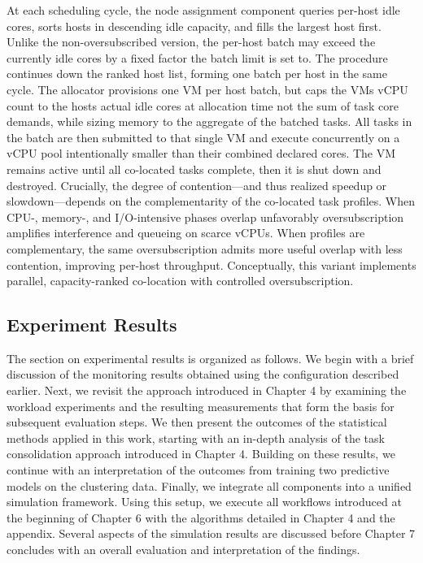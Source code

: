 At each scheduling cycle, the node assignment component queries per-host idle cores, sorts hosts in descending idle capacity, and fills the largest host first. Unlike the non-oversubscribed version, the per-host batch may exceed the currently idle cores by a fixed factor the batch limit is set to. The procedure continues down the ranked host list, forming one batch per host in the same cycle.
The allocator provisions one VM per host batch, but caps the VMs vCPU count to the hosts actual idle cores at allocation time not the sum of task core demands, while sizing memory to the aggregate of the batched tasks. All tasks in the batch are then submitted to that single VM and execute concurrently on a vCPU pool intentionally smaller than their combined declared cores. The VM remains active until all co-located tasks complete, then it is shut down and destroyed.
Crucially, the degree of contention—and thus realized speedup or slowdown—depends on the complementarity of the co-located task profiles. When CPU-, memory-, and I/O-intensive phases overlap unfavorably oversubscription amplifies interference and queueing on scarce vCPUs. When profiles are complementary, the same oversubscription admits more useful overlap with less contention, improving per-host throughput. Conceptually, this variant implements parallel, capacity-ranked co-location with controlled oversubscription.

\subsection{Experiment Results}
\label{sec:experiment_results}
The section on experimental results is organized as follows. We begin with a brief discussion of the monitoring results obtained using the configuration described earlier. Next, we revisit the approach introduced in Chapter 4 by examining the workload experiments and the resulting measurements that form the basis for subsequent evaluation steps. We then present the outcomes of the statistical methods applied in this work, starting with an in-depth analysis of the task consolidation approach introduced in Chapter 4. Building on these results, we continue with an interpretation of the outcomes from training two predictive models on the clustering data. Finally, we integrate all components into a unified simulation framework. Using this setup, we execute all workflows introduced at the beginning of Chapter 6 with the algorithms detailed in Chapter 4 and the appendix. Several aspects of the simulation results are discussed before Chapter 7 concludes with an overall evaluation and interpretation of the findings.

